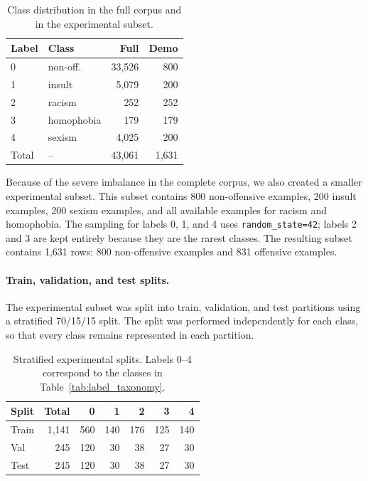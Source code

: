 \begin{table}[H]
\centering
\small
\begin{tabular}{llrr}
\toprule
Label & Class & Full & Demo \\
\midrule
0 & non-off. & 33,526 & 800 \\
1 & insult & 5,079 & 200 \\
2 & racism & 252 & 252 \\
3 & homophobia & 179 & 179 \\
4 & sexism & 4,025 & 200 \\
\midrule
Total & -- & 43,061 & 1,631 \\
\bottomrule
\end{tabular}
\caption{Class distribution in the full corpus and in the experimental subset.}
\label{tab:dataset_distribution}
\end{table}

Because of the severe imbalance in the complete corpus, we also created a smaller experimental subset. This subset contains 800 non-offensive examples, 200 insult examples, 200 sexism examples, and all available examples for racism and homophobia. The sampling for labels 0, 1, and 4 uses \texttt{random\_state=42}; labels 2 and 3 are kept entirely because they are the rarest classes. The resulting subset contains 1,631 rows: 800 non-offensive examples and 831 offensive examples.

\paragraph{Train, validation, and test splits.}
The experimental subset was split into train, validation, and test partitions using a stratified 70/15/15 split. The split was performed independently for each class, so that every class remains represented in each partition.

\begin{table}[H]
\centering
\footnotesize
\begin{tabular}{lrrrrrr}
\toprule
Split & Total & 0 & 1 & 2 & 3 & 4 \\
\midrule
Train & 1,141 & 560 & 140 & 176 & 125 & 140 \\
Val & 245 & 120 & 30 & 38 & 27 & 30 \\
Test & 245 & 120 & 30 & 38 & 27 & 30 \\
\bottomrule
\end{tabular}
\caption{Stratified experimental splits. Labels 0--4 correspond to the classes in Table~\ref{tab:label_taxonomy}.}
\label{tab:demo_splits}
\end{table}

